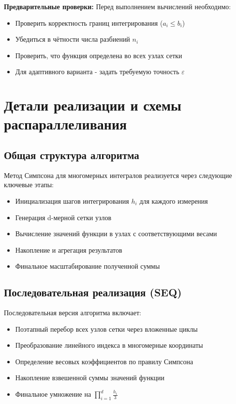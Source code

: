 \documentclass[12pt]{article}
\begin{document}
\textbf{Предварительные проверки:}
Перед выполнением вычислений необходимо:
\begin{itemize}
    \item Проверить корректность границ интегрирования ($a_i \leq b_i$)
    \item Убедиться в чётности числа разбиений $n_i$
    \item Проверить, что функция определена во всех узлах сетки
    \item Для адаптивного варианта - задать требуемую точность $\varepsilon$
\end{itemize}

\newpage
\section{Детали реализации и схемы распараллеливания}

\subsection{Общая структура алгоритма}
Метод Симпсона для многомерных интегралов реализуется через следующие ключевые этапы:
\begin{itemize}
    \item Инициализация шагов интегрирования $h_i$ для каждого измерения
    \item Генерация d-мерной сетки узлов
    \item Вычисление значений функции в узлах с соответствующими весами
    \item Накопление и агрегация результатов
    \item Финальное масштабирование полученной суммы
\end{itemize}

\subsection{Последовательная реализация (SEQ)}
Последовательная версия алгоритма включает:
\begin{itemize}
    \item Поэтапный перебор всех узлов сетки через вложенные циклы
    \item Преобразование линейного индекса в многомерные координаты
    \item Определение весовых коэффициентов по правилу Симпсона
    \item Накопление взвешенной суммы значений функции
    \item Финальное умножение на $\prod_{i=1}^d \frac{h_i}{3}$
\end{itemize}
\end{document}
